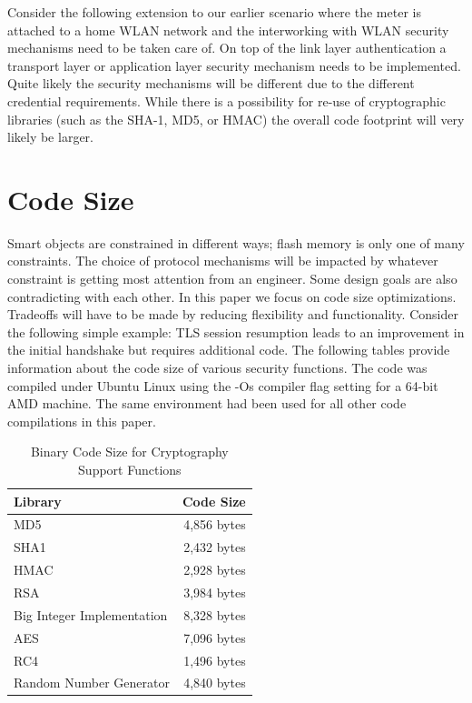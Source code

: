 \documentclass[a4paper, 10pt]{IEEEtran}
\begin{document}
Consider the following extension to our earlier scenario where the meter is attached to a home WLAN network and the interworking with WLAN security mechanisms need to be taken care of. On top of the link layer authentication a transport layer or application layer security mechanism needs to be implemented. Quite likely the security mechanisms will be different due to the different credential requirements. While there is a possibility for re-use of cryptographic libraries (such as the SHA-1, MD5, or HMAC) the overall code footprint will very likely be larger. 

\section{Code Size}

Smart objects are constrained in different ways; flash memory is only one of many constraints. The choice of protocol mechanisms will be impacted by whatever constraint is getting most attention from an engineer. Some design goals are also contradicting with each other. In this paper we focus on code size optimizations. Tradeoffs will have to be made by reducing flexibility and functionality. Consider the following simple example: TLS session resumption leads to an improvement in the initial handshake but requires additional code. The following tables provide information about the code size of various security functions. The code was compiled under Ubuntu Linux using the -Os compiler flag setting for a 64-bit AMD machine. The same environment had been used for all other code compilations in this paper.

\begin{table}[htdp]
\caption{Binary Code Size for Cryptography Support Functions}
\begin{center}
\begin{tabular}{|l|r|}
\hline
\textbf{Library} & \textbf{Code Size}\\
\hline\hline
MD5 & 4,856 bytes \\ 
\hline\hline
SHA1 & 2,432 bytes \\ 
\hline\hline
HMAC & 2,928 bytes \\
\hline\hline
RSA & 3,984 bytes \\
\hline\hline
Big Integer Implementation & 8,328 bytes \\ 
\hline\hline
AES & 7,096 bytes \\
\hline\hline
RC4 & 1,496 bytes \\ 
\hline\hline
Random Number Generator & 4,840 bytes \\
\hline
\end{tabular}
\end{center}
\label{crypto-code-table}
\end{table}
\end{document}
